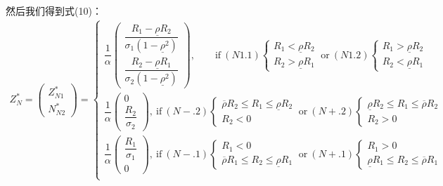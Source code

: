 \documentclass[10.0pt]{article}
\begin{document}
然后我们得到式(10)：
{\small \begin{eqnarray}
Z_N^* = \left( \begin{matrix} Z_{N 1}^* \\ N_{N 2}^* \end{matrix} \right) = \left\{ \begin{matrix}
\dfrac1{\alpha} \left( \begin{matrix} \dfrac{R_1 - \underline{\rho} R_2}{\sigma_1 (1 - \underline{\rho}^2)} \\ \dfrac{R_2 - \underline{\rho} R_1}{\sigma_2 (1 - \underline{\rho}^2)} \end{matrix} \right), \qquad \text{if} \ (N1.1) \left\{ \begin{matrix} R_1 < \underline{\rho} R_2 \\ R_2 > \underline{\rho} R_1 \end{matrix} \right. \ \text{or} \ (N1.2) \left\{ \begin{matrix} R_1 > \underline{\rho} R_2 \\ R_2 < \underline{\rho} R_1 \end{matrix} \right. \\
\dfrac1{\alpha} \left( \begin{matrix} 0 \\ \dfrac{R_2}{\sigma_2} \end{matrix} \right), \ \text{if} \ (N-.2) \left\{ \begin{matrix} \overline{\rho} R_2 \leqslant R_1 \leqslant \underline{\rho} R_2 \\ R_2 < 0 \end{matrix} \right. \ \text{or} \ (N+.2) \left\{ \begin{matrix} \underline{\rho} R_2 \leqslant R_1 \leqslant \overline{\rho} R_2 \\ R_2 > 0 \end{matrix} \right. \\
\dfrac1{\alpha} \left( \begin{matrix} \dfrac{R_1}{\sigma_1} \\ 0 \end{matrix} \right), \ \text{if} \ (N-.1) \left\{ \begin{matrix} R_1 < 0 \\ \overline{\rho} R_1 \leqslant R_2 \leqslant \underline{\rho} R_1 \end{matrix} \right. \ \text{or} \ (N+.1) \left\{ \begin{matrix} R_1 > 0 \\ \underline{\rho} R_1 \leqslant R_2 \leqslant \overline{\rho} R_1 \end{matrix} \right. \\

\end{matrix}
\end{eqnarray}}
\end{document}
